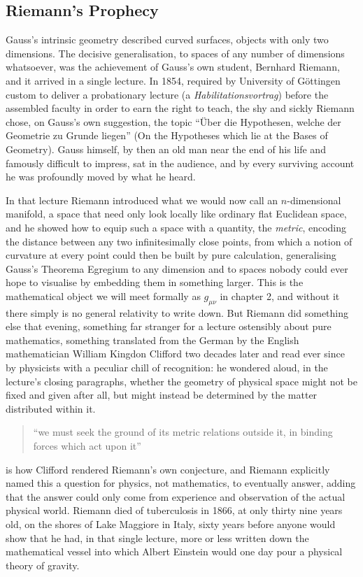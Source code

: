     \subsection{Riemann's Prophecy}

    Gauss's intrinsic geometry described curved surfaces, objects with only two dimensions. The decisive generalisation, to spaces of any number of dimensions whatsoever, was the achievement of Gauss's own student, Bernhard Riemann, and it arrived in a single lecture. In 1854, required by University of Göttingen custom to deliver a probationary lecture (a \textit{Habilitationsvortrag}) before the assembled faculty in order to earn the right to teach, the shy and sickly Riemann chose, on Gauss's own suggestion, the topic ``\"{U}ber die Hypothesen, welche der Geometrie zu Grunde liegen'' (On the Hypotheses which lie at the Bases of Geometry). Gauss himself, by then an old man near the end of his life and famously difficult to impress, sat in the audience, and by every surviving account he was profoundly moved by what he heard.

    In that lecture Riemann introduced what we would now call an $n$-dimensional manifold, a space that need only look locally like ordinary flat Euclidean space, and he showed how to equip such a space with a quantity, the \textit{metric}, encoding the distance between any two infinitesimally close points, from which a notion of curvature at every point could then be built by pure calculation, generalising Gauss's Theorema Egregium to any dimension and to spaces nobody could ever hope to visualise by embedding them in something larger. This is the mathematical object we will meet formally as $g_{\mu\nu}$ in chapter 2, and without it there simply is no general relativity to write down. But Riemann did something else that evening, something far stranger for a lecture ostensibly about pure mathematics, something translated from the German by the English mathematician William Kingdon Clifford two decades later and read ever since by physicists with a peculiar chill of recognition: he wondered aloud, in the lecture's closing paragraphs, whether the geometry of physical space might not be fixed and given after all, but might instead be determined by the matter distributed within it. \begin{quote}
    ``we must seek the ground of its metric relations outside it, in binding forces which act upon it'' \citep{riemann1873}
    \end{quote} is how Clifford rendered Riemann's own conjecture, and Riemann explicitly named this a question for physics, not mathematics, to eventually answer, adding that the answer could only come from experience and observation of the actual physical world. Riemann died of tuberculosis in 1866, at only thirty nine years old, on the shores of Lake Maggiore in Italy, sixty years before anyone would show that he had, in that single lecture, more or less written down the mathematical vessel into which Albert Einstein would one day pour a physical theory of gravity.

